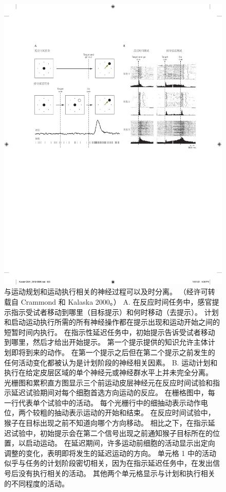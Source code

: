 \begin{figure}[!htb]
	\centering
	\includegraphics[width=1.0\linewidth]{chap34/fig_34_4}
	\caption*{与运动规划和运动执行相关的神经过程可以及时分离。 （经许可转载自 Crammond 和 Kalaska 2000。）
	A. 在反应时间任务中，感官提示指示受试者移动到哪里（目标提示）和何时移动（去提示）。 计划和启动运动执行所需的所有神经操作都在提示出现和运动开始之间的短暂时间内执行。 在指示性延迟任务中，初始提示告诉受试者移动到哪里，然后才给出开始提示。 第一个提示提供的知识允许主体计划即将到来的动作。 在第一个提示之后但在第二个提示之前发生的任何活动变化都被认为是计划阶段的神经相关因素。
	B. 运动计划和执行在给定皮层区域的单个神经元或神经群水平上并未完全分离。 光栅图和累积直方图显示三个前运动皮层神经元在反应时间试验和指示延迟试验期间对每个细胞首选方向运动的反应。 在栅格图中，每一行代表单个试验中的活动。 每个光栅行中的细抽动表示动作电位，两个较粗的抽动表示运动的开始和结束。 在反应时间试验中，猴子在目标出现之前不知道向哪个方向移动。 相比之下，在指示延迟试验中，初始提示会在第二个信号出现之前通知猴子目标所在的位置，以启动运动。 在延迟期间，许多运动前细胞的活动显示出定向调整的变化，表明即将发生的延迟运动的方向。 单元格 1 中的活动似乎与任务的计划阶段密切相关，因为在指示延迟任务中，在发出信号后没有执行相关的活动。 其他两个单元格显示与计划和执行相关的不同程度的活动。}
\end{figure}



